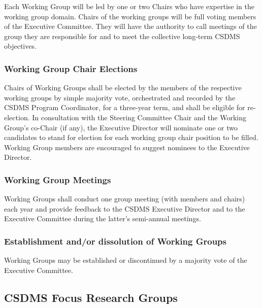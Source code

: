 \documentclass[11pt, oneside]{article}   	%
\begin{document}
Each Working Group will be led by one or two Chairs who have expertise in the working group domain. Chairs of the working groups will be full voting members of the Executive Committee. They will have the authority to call meetings of the group they are responsible for and to meet the collective long-term CSDMS objectives.  

\subsubsection{Working Group Chair Elections}

Chairs of Working Groups shall be elected by the members of the respective working groups by simple majority vote, orchestrated and recorded by the CSDMS Program Coordinator, for a three-year term, and shall be eligible for re-election. In consultation with the Steering Committee Chair and the Working Group's co-Chair (if any), the Executive Director will nominate one or two candidates to stand for election for each working group chair position to be filled. Working Group members are encouraged to suggest nominees to the Executive Director. 

\subsubsection{Working Group Meetings}

Working Groups shall conduct one group meeting (with members and chairs) each year and provide feedback to the CSDMS Executive Director and to the Executive Committee during the latter's semi-annual meetings.

\subsubsection{Establishment and/or dissolution of Working Groups}

Working Groups may be established or discontinued by a majority vote of the Executive Committee. 


\subsection{CSDMS Focus Research Groups}
\end{document}
